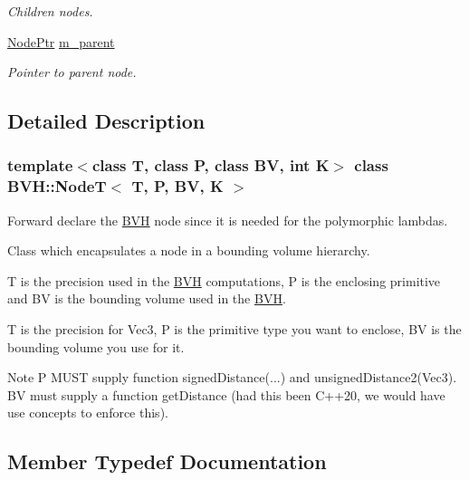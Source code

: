\begin{DoxyCompactItemize}
\begin{DoxyCompactList}\small\item\em Children nodes. \end{DoxyCompactList}\item 
\mbox{\label{classBVH_1_1NodeT_abf7f5d4808d0662f2ee0ae07a4bcddca}} 
\hyperlink{classBVH_1_1NodeT_a008f5c2c53adb1f5730d8478b48529b1}{Node\+Ptr} \hyperlink{classBVH_1_1NodeT_abf7f5d4808d0662f2ee0ae07a4bcddca}{m\+\_\+parent}
\begin{DoxyCompactList}\small\item\em Pointer to parent node. \end{DoxyCompactList}\end{DoxyCompactItemize}


\subsection{Detailed Description}
\subsubsection*{template$<$class T, class P, class BV, int K$>$\newline
class B\+V\+H\+::\+Node\+T$<$ T, P, B\+V, K $>$}

Forward declare the \hyperlink{namespaceBVH}{B\+VH} node since it is needed for the polymorphic lambdas. 

Class which encapsulates a node in a bounding volume hierarchy.

T is the precision used in the \hyperlink{namespaceBVH}{B\+VH} computations, P is the enclosing primitive and BV is the bounding volume used in the \hyperlink{namespaceBVH}{B\+VH}.

T is the precision for Vec3, P is the primitive type you want to enclose, BV is the bounding volume you use for it. \begin{DoxyNote}{Note}
P M\+U\+ST supply function signed\+Distance(...) and unsigned\+Distance2(\+Vec3). BV must supply a function get\+Distance (had this been C++20, we would have use concepts to enforce this). 
\end{DoxyNote}


\subsection{Member Typedef Documentation}
\mbox{\label{classBVH_1_1NodeT_ac52d9b56f082002c7f8be91062c40ff8}} 
